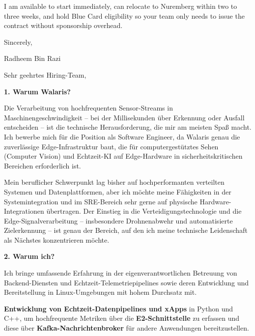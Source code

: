 \documentclass[11pt,a4paper]{coverletter}
\begin{document}
\bulletsend

I am available to start immediately, can relocate to Nuremberg within two to three weeks, and hold Blue Card eligibility so your team only needs to issue the contract without sponsorship overhead.

\closing{Sincerely,}{Radheem Bin Razi}

\clearpage
{}


\opening{Sehr geehrtes Hiring-Team,}

\vspace{8pt}\noindent\textbf{1. Warum Walaris?}\par\vspace{3pt}

Die Verarbeitung von hochfrequenten Sensor-Streams in Maschinengeschwindigkeit – bei der Millisekunden über Erkennung oder Ausfall entscheiden – ist die technische Herausforderung, die mir am meisten Spaß macht. Ich bewerbe mich für die Position als Software Engineer, da Walaris genau die zuverlässige Edge-Infrastruktur baut, die für computergestütztes Sehen (Computer Vision) und Echtzeit-KI auf Edge-Hardware in sicherheitskritischen Bereichen erforderlich ist.

Mein beruflicher Schwerpunkt lag bisher auf hochperformanten verteilten Systemen und Datenplattformen, aber ich möchte meine Fähigkeiten in der Systemintegration und im SRE-Bereich sehr gerne auf physische Hardware-Integrationen übertragen. Der Einstieg in die Verteidigungstechnologie und die Edge-Signalverarbeitung – insbesondere Drohnenabwehr und automatisierte Zielerkennung – ist genau der Bereich, auf den ich meine technische Leidenschaft als Nächstes konzentrieren möchte.

\vspace{8pt}\noindent\textbf{2. Warum ich?}\par\vspace{3pt}

Ich bringe umfassende Erfahrung in der eigenverantwortlichen Betreuung von Backend-Diensten und Echtzeit-Telemetriepipelines sowie deren Entwicklung und Bereitstellung in Linux-Umgebungen mit hohem Durchsatz mit.

\bullets

  \item \textbf{Entwicklung von Echtzeit-Datenpipelines und xApps} in Python und C++, um hochfrequente Metriken über die \textbf{E2-Schnittstelle} zu erfassen und diese über \textbf{Kafka-Nachrichtenbroker} für andere Anwendungen bereitzustellen.
\end{document}
